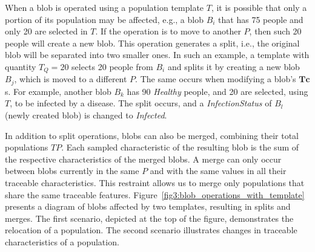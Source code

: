 \documentclass[pdflatex,sn-mathphys-num]{sn-jnl}%
\theoremstyle{thmstyleone}%
\theoremstyle{thmstyletwo}%
\theoremstyle{thmstylethree}%
\begin{document}
When a blob is operated using a population template $T$, it is possible that only a portion of its population may be affected, e.g., a blob $B_i$ that has 75 people and only 20 are selected in $T$. If the operation is to move to another $P$, then such 20 people will create a new blob. This operation generates a split, i.e., the original blob will be separated into two smaller ones. 
In such an example, a template with quantity $T_Q = 20$ selects 20 people from $B_i$ and splits it by creating a new blob $B_j$, which is moved to a different $P$. 
The same occurs when modifying a blob's $\bm{Tc}$s. For example, another blob $B_k$ has 90 \textit{Healthy} people, 
and 20 are selected, using $T$, to be infected by a disease. The split occurs, and a \textit{InfectionStatus} of $B_l$ (newly created blob) is changed to \textit{Infected}.

In addition to split operations, blobs can also be merged, combining their total populations $TP$. 
Each sampled characteristic of the resulting blob is the sum of the respective characteristics of the merged blobs. A merge can only occur between blobs currently in the same $P$ and with the same values in all their traceable characteristics. This restraint allows us to merge only populations that share the same traceable features.
Figure~\ref{fig3:blob_operations_with_template} presents a diagram of blobs affected by two templates, resulting in splits and merges. The first scenario, depicted at the top of the figure, demonstrates the relocation of a population. %
The second scenario illustrates changes in traceable characteristics of a population.%
\end{document}
